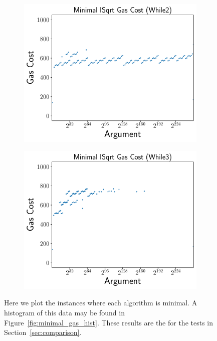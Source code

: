 \begin{figure}[p]
    \begin{subfigure}[t]{0.45\textwidth}
    \includegraphics[width=\textwidth]{plots/minimal_plot_While2.pdf}
    \end{subfigure}
    \begin{subfigure}[t]{0.45\textwidth}
    \includegraphics[width=\textwidth]{plots/minimal_plot_While3.pdf}
    \end{subfigure}
    \caption{Here we plot the instances where each algorithm is minimal.
        A histogram of this data may be found in
        Figure~\ref{fig:minimal_gas_hist}.
        These results are the for the tests in Section~\ref{sec:comparison}.
        }
    \label{fig:minimal_gas}
\end{figure}
